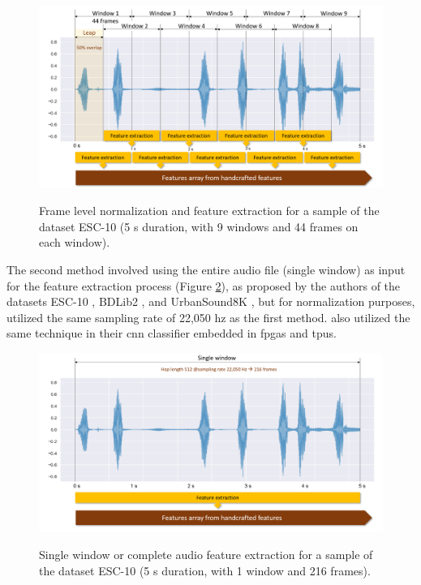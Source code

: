 \begin{figure}[htbp]
    \raggedright
        \caption{Frame level normalization and feature extraction for a sample of the dataset ESC-10 (5 \gls{s} duration, with 9 windows and 44 frames on each window).}
        \includegraphics[width=1\textwidth]{resources/images/050-methods/Methods_feature_extraction_1_BDLib2.png}
        \label{fig:methods_feature_extraction_leap_window}
\end{figure}

The second method involved using the entire audio file (single window) as input for the feature extraction process (Figure \ref{fig:methods_feature_extraction_single_window}), as proposed by the authors of the datasets ESC-10 \cite{PiczakESC2015}, BDLib2 \cite{Bountourakis2015}, and UrbanSound8K \cite{Salamon2017}, but for normalization purposes, utilized the same sampling rate of 22,050 \gls{hz} as the first method. \Textcite{Vandendriessche2021} also utilized the same technique in their \gls{cnn} classifier embedded in \gls{fpga}s and \gls{tpu}s.


\begin{figure}[htbp]
    \raggedright
        \caption{Single window or complete audio feature extraction for a sample of the dataset ESC-10 (5 \gls{s} duration, with 1 window and 216 frames).}
        \includegraphics[width=1\textwidth]{resources/images/050-methods/Methods_feature_extraction_2_BDLib2.png}
        \label{fig:methods_feature_extraction_single_window}
\end{figure}

